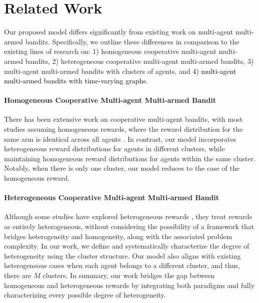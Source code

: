\section{Related Work}
\label{sec:2.2}


Our proposed model differs significantly from existing work on multi-agent multi-armed bandits. Specifically, we outline these differences in comparison to the existing lines of research on: 1) homogeneous cooperative multi-agent multi-armed bandits, 2) heterogeneous cooperative multi-agent multi-armed bandits, 3) multi-agent multi-armed bandits with clusters of agents, and \textcolor{black}{4) multi-agent multi-armed bandits with time-varying graphs.}

\paragraph{Homogeneous Cooperative Multi-agent Multi-armed Bandit} 
There has been extensive work on cooperative multi-agent bandits, with most studies assuming homogeneous rewards, where the reward distribution for the same arm is identical across all agents \citep{landgren2016distributed,landgren2016distributed_2,landgren2021distributed,zhu2020distributed,martinez2019decentralized,agarwal2022multi,wangx2022achieving,wangp2020optimal,li2022privacy,sankararaman2019social,chawla2020gossiping}. In contrast, our model incorporates heterogeneous reward distributions for agents in different clusters, while maintaining homogeneous reward distributions for agents within the same cluster. Notably, when there is only one cluster, our model reduces to the case of the homogeneous reward. 

\paragraph{Heterogeneous Cooperative Multi-agent Multi-armed Bandit} Although some studies have explored heterogeneous rewards \citep{xu2023decentralized, zhu2023distributed, zhao2020privacy}, they treat rewards as entirely heterogeneous, without considering the possibility of a framework that bridges heterogeneity and homogeneity, along with the associated problem complexity. In our work, we define and systematically characterize the degree of heterogeneity using the cluster structure. Our model also aligns with existing heterogeneous cases when each agent belongs to a different cluster, and thus, there are $M$ clusters. In summary, our work bridges the gap between homogeneous and heterogeneous rewards by integrating both paradigms and fully characterizing every possible degree of heterogeneity.

